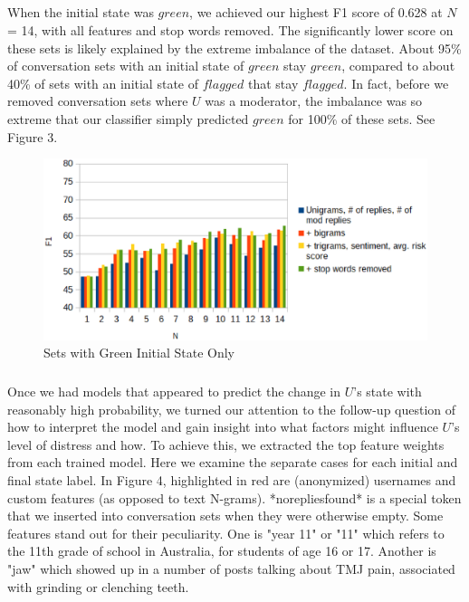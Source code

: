 \documentclass{article}
\begin{document}
\subparagraph{}When the initial state was $green$, we achieved our highest F1 score of 0.628 at $N$ = 14, with all features and stop words removed. The significantly lower score on these sets is likely explained by the extreme imbalance of the dataset. About 95\% of conversation sets with an initial state of $green$ stay $green$, compared to about 40\% of sets with an initial state of $flagged$ that stay $flagged$. In fact, before we removed conversation sets where $U$ was a moderator, the imbalance was so extreme that our classifier simply predicted $green$ for 100\% of these sets. See Figure 3.

\begin{figure}[h!]
    \includegraphics[width=14cm]{resultsGreen}
    \caption{Sets with Green Initial State Only}
\end{figure}

\subparagraph{}Once we had models that appeared to predict the change in $U$'s state with reasonably high probability, we turned our attention to the follow-up question of how to interpret the model and gain insight into what factors might influence $U$'s level of distress and how. To achieve this, we extracted the top feature weights from each trained model. Here we examine the separate cases for each initial and final state label. In Figure 4, highlighted in red are (anonymized) usernames and custom features (as opposed to text N-grams). *norepliesfound* is a special token that we inserted into conversation sets when they were otherwise empty. Some features stand out for their peculiarity. One is "year 11" or "11" which refers to the 11th grade of school in Australia, for students of age 16 or 17. Another is "jaw" which showed up in a number of posts talking about TMJ pain, associated with grinding or clenching teeth.
\end{document}
